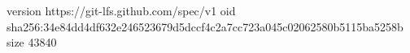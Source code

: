 version https://git-lfs.github.com/spec/v1
oid sha256:34e84dd4df632e246523679d5dccf4c2a7cc723a045c02062580b5115ba5258b
size 43840
